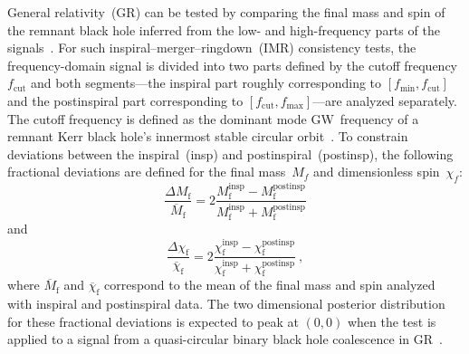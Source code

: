 General relativity~(GR) can be tested by comparing the final mass and spin of the remnant black hole inferred from the low- and high-frequency parts of the signals~\citep{ghosh:2018, ligo_test_gr_gwtc2:2020, lvk_gwtc3_tests_gr:2025}.
For such inspiral–merger–ringdown~(IMR) consistency tests, the frequency-domain signal is divided into two parts defined by the cutoff frequency~$f_\mathrm{cut}$ and both segments---the inspiral part roughly corresponding to $[f_\mathrm{min}, f_\mathrm{cut}]$ and the postinspiral part corresponding to $[f_\mathrm{cut}, f_\mathrm{max}]$---are analyzed separately.
The cutoff frequency is defined as the dominant mode GW~frequency of a remnant Kerr black hole's innermost stable circular orbit~\citep{lvk_gwtc3_tests_gr:2025}.
To constrain deviations between the inspiral~(insp) and postinspiral~(postinsp), the following fractional deviations are defined for the final mass~$M_f$ and dimensionless spin~$\chi_f$:
\begin{equation}
	\frac{\Delta M_\text{f}}{\overline{M}_\text{f}} = 2\frac{M_\text{f}^\text{insp} -M_\text{f}^\text{postinsp} }{M_\text{f}^\text{insp} + M_\text{f}^\text{postinsp}}
\end{equation}
and 
\begin{equation}
	\frac{\Delta \chi_\text{f}}{\overline{\chi}_\text{f}} = 2\frac{\chi_\text{f}^\text{insp} -\chi_\text{f}^\text{postinsp} }{\chi_\text{f}^\text{insp} + \chi_\text{f}^\text{postinsp}}~,
\end{equation}
where $\overline{M}_\text{f}$ and $\overline{\chi}_\text{f}$ correspond to 
the mean of the final mass and spin analyzed with inspiral and postinspiral data.
The two dimensional posterior distribution for these fractional deviations is expected to peak at $(0,0)$ when the test is applied to a signal from a quasi-circular binary black hole coalescence in GR~\citep{ghosh:2018, ligo_test_gr_gwtc2:2020, lvk_gwtc3_tests_gr:2025}.

